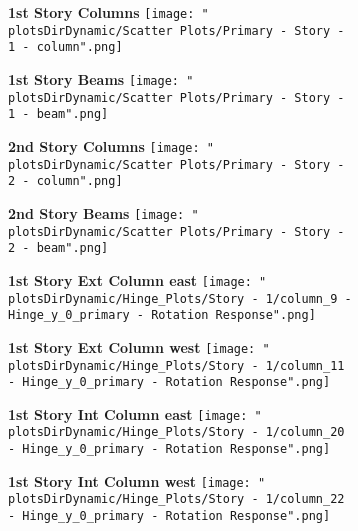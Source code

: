 \documentclass[12pt]{article} %
\begin{document}
		\begin{figure}[h]
			\centering
			\begin{subfigure}{.49\textwidth}
				\centering
				\textbf{1st Story Columns}
				\texttt{[image: "\\plotsDirDynamic/Scatter Plots/Primary - Story - 1 - column".png]}
			\end{subfigure}
			\begin{subfigure}{.49\textwidth}
				\centering
				\textbf{1st Story Beams}
				\texttt{[image: "\\plotsDirDynamic/Scatter Plots/Primary - Story - 1 - beam".png]}
			\end{subfigure}
		\end{figure}
		\begin{figure}[h]
			\centering
			\begin{subfigure}{.49\textwidth}
				\centering
				\textbf{2nd Story Columns}
				\texttt{[image: "\\plotsDirDynamic/Scatter Plots/Primary - Story - 2 - column".png]}
			\end{subfigure}
			\begin{subfigure}{.49\textwidth}
				\centering
				\textbf{2nd Story Beams}
				\texttt{[image: "\\plotsDirDynamic/Scatter Plots/Primary - Story - 2 - beam".png]}
			\end{subfigure}
		\end{figure}
		\pagebreak

		\begin{figure}[h]
			\centering
			\begin{subfigure}{.49\textwidth}
				\centering
				\textbf{1st Story Ext Column east}
				\texttt{[image: "\\plotsDirDynamic/Hinge\_Plots/Story - 1/column\_9 - Hinge\_y\_0\_primary - Rotation Response".png]}
			\end{subfigure}
			\begin{subfigure}{.49\textwidth}
				\centering
				\textbf{1st Story Ext Column west}
				\texttt{[image: "\\plotsDirDynamic/Hinge\_Plots/Story - 1/column\_11 - Hinge\_y\_0\_primary - Rotation Response".png]}
			\end{subfigure}
		\end{figure}
		\begin{figure}[h]
			\centering
			\begin{subfigure}{.49\textwidth}
				\centering
				\textbf{1st Story Int Column east}
				\texttt{[image: "\\plotsDirDynamic/Hinge\_Plots/Story - 1/column\_20 - Hinge\_y\_0\_primary - Rotation Response".png]}
			\end{subfigure}
			\begin{subfigure}{.49\textwidth}
				\centering
				\textbf{1st Story Int Column west}
				\texttt{[image: "\\plotsDirDynamic/Hinge\_Plots/Story - 1/column\_22 - Hinge\_y\_0\_primary - Rotation Response".png]}
			\end{subfigure}
		\end{figure}
		\pagebreak
	
\end{document}
